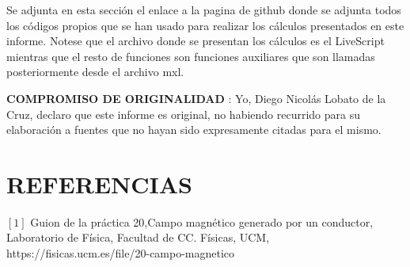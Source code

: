 \documentclass[article, 11pt]{report}
\begin{document}
Se adjunta en esta sección el enlace a la pagina de github donde se adjunta todos los códigos propios que se han usado para realizar los cálculos presentados en este informe. Notese que el archivo donde se presentan los cálculos es el LiveScript mientras que el resto de funciones son funciones auxiliares que son llamadas posteriormente desde el archivo mxl.

\textbf{COMPROMISO DE ORIGINALIDAD }: Yo, Diego Nicolás Lobato de la Cruz, declaro que este informe es original, no habiendo recurrido para su elaboración a fuentes que no hayan sido expresamente citadas para el mismo.



\section{REFERENCIAS}

$[1]$ Guion de la práctica 20,Campo magnético generado por un conductor, Laboratorio de Física, Facultad de CC. Físicas, UCM, https://fisicas.ucm.es/file/20-campo-magnetico\\



\newpage 


\centering
\end{document}
